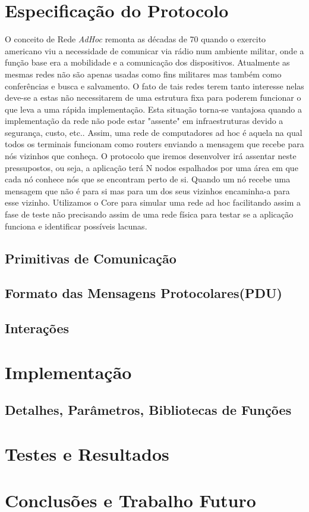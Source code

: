 \documentclass[11pt, a4paper, oneside]{article}
\begin{document}
\newpage
\section{Especificação do Protocolo}
O conceito de Rede \textit{AdHoc} remonta as décadas de 70 quando o exercito americano viu a necessidade de comunicar via rádio num ambiente militar, onde a função base era a mobilidade e a comunicação dos dispositivos.
	Atualmente as mesmas redes não são apenas usadas como fins militares mas também como conferências e busca e salvamento.
	O fato de tais redes terem tanto interesse nelas deve-se a estas não necessitarem de uma estrutura fixa para poderem funcionar o que leva a uma rápida implementação.
	Esta situação torna-se vantajosa quando a implementação da rede não pode estar "assente" em infraestruturas devido a segurança, custo, etc..
	Assim, uma rede de computadores ad hoc é aquela na qual todos os terminais funcionam como routers enviando a mensagem que recebe para nós vizinhos que conheça.
	O protocolo que iremos desenvolver irá assentar neste pressupostos, ou seja, a aplicação terá N nodos espalhados por uma área em que cada nó conhece nós que se encontram perto de si.
	Quando um nó recebe uma mensagem que não é para si mas para um dos seus vizinhos encaminha-a para esse vizinho.
	Utilizamos o Core para simular uma rede ad hoc facilitando assim a fase de teste não precisando assim de uma rede física para testar se a aplicação funciona e identificar possíveis lacunas.


\subsection{Primitivas de Comunicação}

\subsection{Formato das Mensagens Protocolares(PDU)}
\subsection{Interações}

\section{Implementação}
\subsection{Detalhes, Parâmetros, Bibliotecas de Funções}

\section{Testes e Resultados}
\section{Conclusões e Trabalho Futuro}
\end{document}
